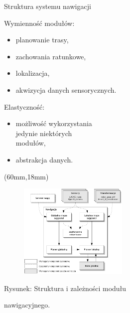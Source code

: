 \documentclass[xcolor=x11names,compress]{beamer}
\renewcommand{\(}{\begin{columns}}
\renewcommand{\)}{\end{columns}}
\newcommand{\<}[1]{\begin{column}{#1}}
\renewcommand{\>}{\end{column}}
\begin{document}
\begin{frame}{Struktura systemu nawigacji}

\alert{Wymienność modułów:}
\begin{itemize}
\item planowanie trasy,
\item zachowania ratunkowe,
\item lokalizacja,
\item akwizycja danych sensorycznych.
\end{itemize}

\vspace{.5cm}

\alert{Elastyczność:}
\begin{itemize}
\item możliwość wykorzystania\\jedynie niektórych\\modułów,
\item abstrakcja danych.
\end{itemize}

\begin{textblock*}{70mm}(60mm,18mm)%
    \begin{minipage}[c]{70mm}%
	\begin{figure}[h!]
	\includegraphics[width=5.2cm]{../MSc/img/diag_move_base}
	\end{figure}
	\hspace{1cm}\scriptsize \alert{Rysunek:} Struktura i zależności modułu

	\hspace{1cm}nawigacyjnego.
    \end{minipage}
\end{textblock*}

\end{frame}
\end{document}

